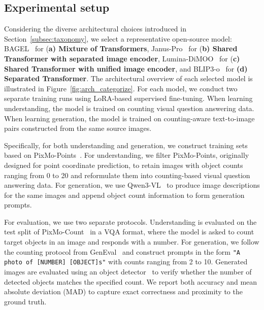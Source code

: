 \vspace{-10pt}
\subsection{Experimental setup} 

Considering the diverse architectural choices introduced in Section~\ref{subsec:taxonomy}, we select a representative open-source model: BAGEL~\cite{deng2025bagel} for (\textbf{a) Mixture of Transformers}, Janus-Pro~\cite{chen2025januspro} for (\textbf{b) Shared Transformer with separated image encoder}, Lumina-DiMOO~\cite{xin2025lumina} for (\textbf{c) Shared Transformer with unified image encoder}, and BLIP3-o~\cite{chen2505blip3} for \textbf{(d) Separated Transformer}. The architectural overview of each selected model is illustrated in Figure~\ref{fig:arch_categorize}. For each model, we conduct two separate training runs using LoRA-based supervised fine-tuning. When learning understanding, the model is trained on counting visual question answering data. When learning generation, the model is trained on counting-aware text-to-image pairs constructed from the same source images.

Specifically, for both understanding and generation, we construct training sets based on PixMo-Points~\cite{deitke2025molmo}. For understanding, we filter PixMo-Points, originally designed for point coordinate prediction, to retain images with object counts ranging from 0 to 20 and reformulate them into counting-based visual question answering data. For generation, we use Qwen3-VL~\cite{bai2025qwen3} to produce image descriptions for the same images and append object count information to form generation prompts.


For evaluation, we use two separate protocols. Understanding is evaluated on the test split of PixMo-Count~\cite{deitke2025molmo} in a VQA format, where the model is asked to count target objects in an image and responds with a number. For generation, we follow the counting protocol from GenEval~\cite{ghosh2023geneval} and construct prompts in the form \texttt{"A photo of [NUMBER] [OBJECT]s"} with counts ranging from 2 to 10. Generated images are evaluated using an object detector~\cite{cheng2022masked} to verify whether the number of detected objects matches the specified count. We report both accuracy and mean absolute deviation (MAD) to capture exact correctness and proximity to the ground truth.


